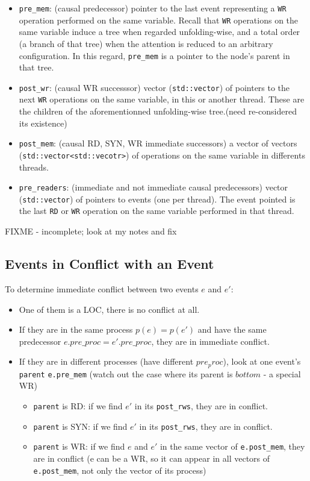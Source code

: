 \documentclass{llncs}
\begin{document}
\begin{itemize}
\item
  \verb!pre_mem!: (causal predecessor) pointer to the last event
  representing a \verb!WR! operation performed on the same variable.
  Recall that \verb!WR! operations on the same variable induce a tree when
  regarded unfolding-wise, and a total order (a branch of that tree) when
  the attention is reduced to an arbitrary configuration.
  In this regard, \verb!pre_mem! is a pointer to the node's parent in that
  tree.
\item
	
  \verb!post_wr!: (causal WR successsor) vector (\verb!std::vector!) of
  pointers to the next \verb!WR! operations on the same variable, in this
  or another thread. These are the children of the aforementionned
  unfolding-wise tree.(need re-considered its existence)
\item
  \verb!post_mem!: (causal RD, SYN, WR immediate successors) a vector of vectors (\verb!std::vector<std::vecotr>!) of operations on the same variable in differents threads. 
	
\item
  \verb!pre_readers!: (immediate and not immediate causal predecessors)
  vector (\verb!std::vector!) of pointers to events (one per thread).
  The event pointed is the last \verb!RD! or \verb!WR! operation on the
  same variable performed in that thread.
\end{itemize}

FIXME - incomplete; look at my notes and fix


\subsection{Events in Conflict with an Event}
To determine immediate conflict between two events $e$ and $e'$: 
\begin{itemize}
	\item
		One of them is a LOC, there is no conflict at all.
	\item
		If they are in the same process $p(e) = p(e')$ and have the same predecessor $e.pre\_proc = e'.pre\_proc$, they are in immediate conflict.
	\item
		If they are in different processes (have different $pre_proc$), look at one event's \verb!parent! \verb!e.pre_mem! (watch out the case where its parent is $bottom$ - a special WR)
	\begin{itemize}
		\item
			\verb!parent! is RD: if we find $e'$ in its \verb!post_rws!, they are in conflict.
		\item
			\verb!parent! is SYN: if we find $e'$ in its \verb!post_rws!, they are in conflict.
		\item
			\verb!parent! is WR: if we find $e$ and $e'$ in the same vector of \verb!e.post_mem!, they are in conflict (e can be a WR, so it can appear in all vectors of \verb!e.post_mem!, not only the vector of its process)
	\end{itemize}
		
\end{itemize}
\end{document}
